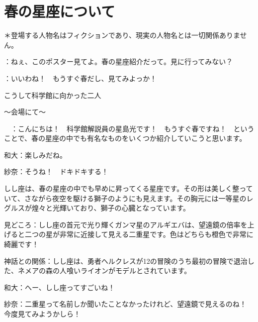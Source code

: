 \documentclass[supernova_2023]{subfiles}
\begin{document}
\chapter{春の星座について}
＊登場する人物名はフィクションであり、現実の人物名とは一切関係ありません。


\phantom{a}\par
{}：ねぇ、このポスター見てよ。春の星座紹介だって。見に行ってみない？


\phantom{a}\par
{}：いいわね！　もうすぐ春だし、見てみよっか！　


\phantom{a}\par
こうして科学館に向かった二人


\phantom{a}\par
〜会場にて〜


\phantom{a}\par
{}　：こんにちは！　科学館解説員の星島光です！　もうすぐ春ですね！　ということで、春の星座の中でも有名なものをいくつか紹介していこうと思います。


\phantom{a}\par
和大：楽しみだね。


\phantom{a}\par
紗奈：そうね！　ドキドキする！


\phantom{a}\par
{}
{}
\begin{tcolorbox}[title=1. しし座, breakable]
しし座は、春の星座の中でも早めに昇ってくる星座です。その形は美しく整っていて、さながら夜空を駆ける獅子のようにも見えます。その胸元には一等星のレグルスが煌々と光輝いており、獅子の心臓となっています。


\phantom{a}\par
見どころ：しし座の首元で光り輝くガンマ星のアルギエバは、望遠鏡の倍率を上げると二つの星が非常に近接して見える二重星です。色はどちらも橙色で非常に綺麗です！


\phantom{a}\par
神話との関係：しし座は、勇者ヘルクレスが12の冒険のうち最初の冒険で退治した、ネメアの森の人喰いライオンがモデルとされています。  
\end{tcolorbox}

\phantom{a}\par
和大：へー、しし座ってすごいね！


\phantom{a}\par
紗奈：二重星って名前しか聞いたことなかったけれど、望遠鏡で見えるのね！　今度見てみようかしら！
\end{document}
